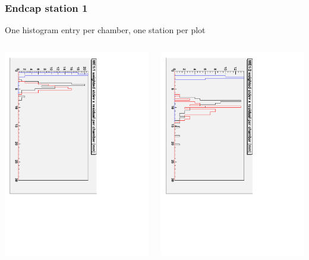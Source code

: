 \documentclass[compress]{beamer}
\begin{document}
\begin{frame}
\frametitle{Endcap station 1}
One histogram entry per chamber, one station per plot

\begin{columns}
\includegraphics[height=\linewidth, angle=90]{stdevs_me11.pdf}

\includegraphics[height=\linewidth, angle=90]{stdevs_me12.pdf}


\end{columns}
\end{frame}
\end{document}
